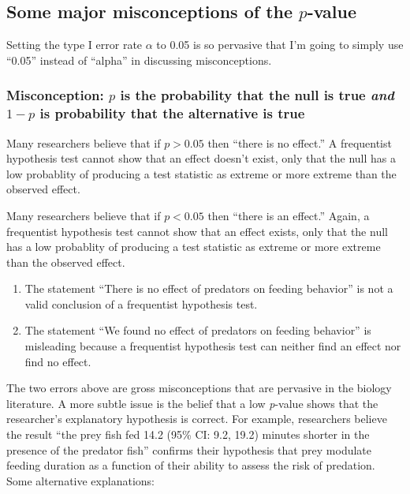 \documentclass[]{book}
\providecommand{\tightlist}{%
  \setlength{\itemsep}{0pt}\setlength{\parskip}{0pt}}
\begin{document}
\subsection{\texorpdfstring{Some major misconceptions of the
\(p\)-value}{Some major misconceptions of the p-value}}\label{some-major-misconceptions-of-the-p-value}

Setting the type I error rate \(\alpha\) to 0.05 is so pervasive that
I'm going to simply use ``0.05'' instead of ``alpha'' in discussing
misconceptions.

\subsubsection{\texorpdfstring{Misconception: \(p\) is the probability
that the null is true \emph{and} \(1-p\) is probability that the
alternative is
true}{Misconception: p is the probability that the null is true and 1-p is probability that the alternative is true}}\label{misconception-p-is-the-probability-that-the-null-is-true-and-1-p-is-probability-that-the-alternative-is-true}

Many researchers believe that if \(p > 0.05\) then ``there is no
effect.'' A frequentist hypothesis test cannot show that an effect
doesn't exist, only that the null has a low probablity of producing a
test statistic as extreme or more extreme than the observed effect.

Many researchers believe that if \(p < 0.05\) then ``there is an
effect.'' Again, a frequentist hypothesis test cannot show that an
effect exists, only that the null has a low probablity of producing a
test statistic as extreme or more extreme than the observed effect.

\begin{enumerate}
\def\labelenumi{\arabic{enumi}.}
\tightlist
\item
  The statement ``There is no effect of predators on feeding behavior''
  is not a valid conclusion of a frequentist hypothesis test.
\item
  The statement ``We found no effect of predators on feeding behavior''
  is misleading because a frequentist hypothesis test can neither find
  an effect nor find no effect.
\end{enumerate}

The two errors above are gross misconceptions that are pervasive in the
biology literature. A more subtle issue is the belief that a low
\emph{p}-value shows that the researcher's explanatory hypothesis is
correct. For example, researchers believe the result ``the prey fish fed
14.2 (95\% CI: 9.2, 19.2) minutes shorter in the presence of the
predator fish'' confirms their hypothesis that prey modulate feeding
duration as a function of their ability to assess the risk of predation.
Some alternative explanations:
\end{document}
